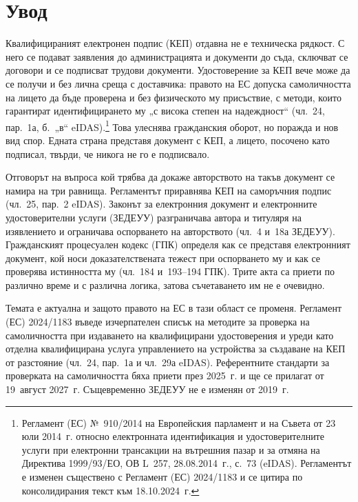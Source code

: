 \section{Увод}
\label{sec:uvod}

Квалифицираният електронен подпис (КЕП) отдавна не е техническа рядкост. С него се
подават заявления до администрацията и документи до съда, сключват се договори и се
подписват трудови документи. Удостоверение за КЕП вече може да се получи и без лична среща
с доставчика: правото на ЕС допуска самоличността на лицето да бъде проверена и без
физическото му присъствие, с методи, които гарантират идентифицирането му „с висока степен
на надеждност“ (чл.~24, пар.~1а, б.~„в“ eIDAS).\footnote{Регламент (ЕС) №~910/2014 на
Европейския парламент и на Съвета от 23 юли 2014~г. относно електронната идентификация и
удостоверителните услуги при електронни трансакции на вътрешния пазар и за отмяна на
Директива 1999/93/ЕО, ОВ L~257, 28.08.2014~г., с.~73 (eIDAS). Регламентът е изменен
съществено с Регламент (ЕС) 2024/1183 и се цитира по консолидирания текст към
18.10.2024~г.} Това улеснява гражданския оборот, но поражда и нов вид спор. Едната страна
представя документ с КЕП, а лицето, посочено като подписал, твърди, че никога не го е
подписвало.

Отговорът на въпроса кой трябва да докаже авторството на такъв документ се намира на три
равнища. Регламентът приравнява КЕП на саморъчния подпис (чл.~25, пар.~2 eIDAS). Законът
за електронния документ и електронните удостоверителни услуги (ЗЕДЕУУ) разграничава автора
и титуляря на изявлението и ограничава оспорването на авторството (чл.~4 и~18а ЗЕДЕУУ).
Гражданският процесуален кодекс (ГПК) определя как се представя електронният документ,
кой носи доказателствената тежест при оспорването му и как се проверява истинността му
(чл.~184 и~193--194 ГПК). Трите акта са приети по различно време и с различна логика,
затова съчетаването им не е очевидно.

Темата е актуална и защото правото на ЕС в тази област се променя. Регламент (ЕС)
2024/1183 въведе изчерпателен списък на методите за проверка на самоличността при
издаването на квалифицирани удостоверения и уреди като отделна квалифицирана услуга
управлението на устройства за създаване на КЕП от разстояние (чл.~24, пар.~1а и чл.~29а
eIDAS). Референтните стандарти за проверката на самоличността бяха приети през 2025~г. и
ще се прилагат от 19~август 2027~г. Същевременно ЗЕДЕУУ не е изменян от 2019~г.

